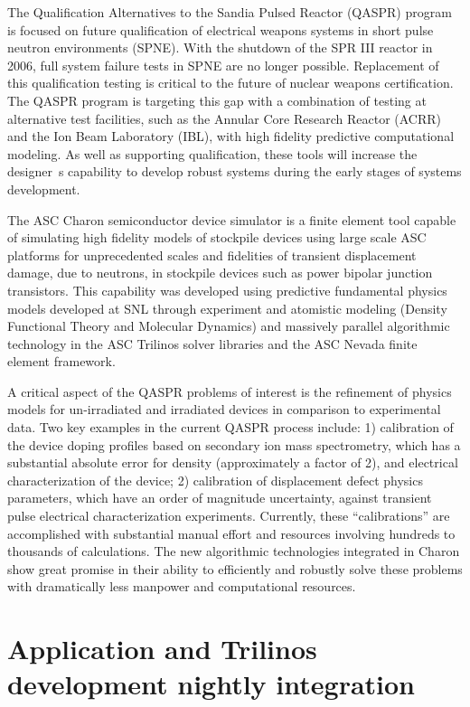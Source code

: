 \documentclass[pdf,ps2pdf,11pt]{SANDreport}
\begin{document}
The Qualification Alternatives to the Sandia Pulsed Reactor (QASPR) program is
focused on future qualification of electrical weapons systems in short pulse
neutron environments (SPNE).  With the shutdown of the SPR III reactor in
2006, full system failure tests in SPNE are no longer possible.  Replacement
of this qualification testing is critical to the future of nuclear weapons
certification.  The QASPR program is targeting this gap with a combination of
testing at alternative test facilities, such as the Annular Core Research
Reactor (ACRR) and the Ion Beam Laboratory (IBL), with high fidelity
predictive computational modeling.  As well as supporting qualification, these
tools will increase the designer~s capability to develop robust systems during
the early stages of systems development.

The ASC Charon semiconductor device simulator is a finite element tool capable
of simulating high fidelity models of stockpile devices using large scale ASC
platforms for unprecedented scales and fidelities of transient displacement
damage, due to neutrons, in stockpile devices such as power bipolar junction
transistors.  This capability was developed using predictive fundamental
physics models developed at SNL through experiment and atomistic modeling
(Density Functional Theory and Molecular Dynamics) and massively parallel
algorithmic technology in the ASC Trilinos solver libraries and the ASC Nevada
finite element framework.

A critical aspect of the QASPR problems of interest is the refinement of
physics models for un-irradiated and irradiated devices in comparison to
experimental data.  Two key examples in the current QASPR process include: 1)
calibration of the device doping profiles based on secondary ion mass
spectrometry, which has a substantial absolute error for density
(approximately a factor of 2), and electrical characterization of the device;
2) calibration of displacement defect physics parameters, which have an order
of magnitude uncertainty, against transient pulse electrical characterization
experiments.  Currently, these ``calibrations'' are accomplished with
substantial manual effort and resources involving hundreds to thousands of
calculations.  The new algorithmic technologies integrated in Charon show
great promise in their ability to efficiently and robustly solve these
problems with dramatically less manpower and computational resources.

%
\section{Application and Trilinos development nightly integration}
%
\end{document}
